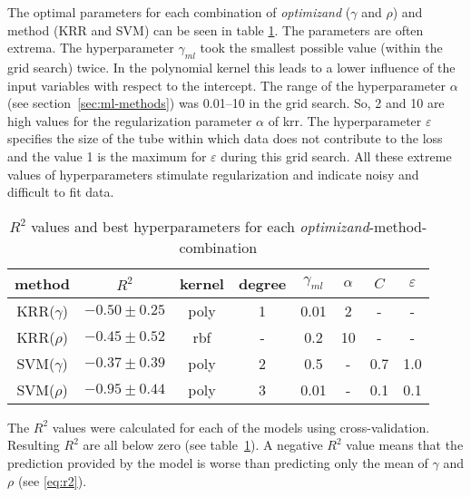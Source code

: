 The optimal parameters for each combination of 
\textit{optimizand} ($\gamma$ and $\rho$) and method (KRR and SVM) 
can be seen in table \ref{tab:grid-search}. 
The parameters are often extrema.
The hyperparameter $\gamma_{ml}$ took the smallest possible value (within the grid search) twice. 
In the polynomial kernel this leads to a lower influence of the input variables with respect to the intercept. 
The range of the hyperparameter $\alpha$ (see section~\ref{sec:ml-methods}) was 0.01--10 in the grid search. 
So, 2 and 10 are high values for the regularization parameter $\alpha$ of \gls{krr}.
The hyperparameter $\varepsilon$ specifies the size of the tube within which data does not contribute to the loss 
and the value 1 is the maximum for $\varepsilon$ during this grid search. 
All these extreme values of hyperparameters stimulate regularization and indicate noisy and difficult to fit data.
\begin{table}
    \center
    \begin{tabular}{cccccccc}
        \hline\hline
        method  &$R^2$   &kernel &degree &$\gamma_{ml}$   &$\alpha$    &$C$    &$\varepsilon$\\
        \hline
        KRR($\gamma$) & $-0.50 \pm 0.25$  &poly   &1  &0.01   &2 &-&-\\
        KRR($\rho  $) & $-0.45 \pm 0.52$  &rbf    &-   &0.2   &10&-&-\\
        SVM($\gamma$) & $-0.37 \pm 0.39$  &poly   &2  &0.5    &-&0.7  &1.0  \\
        SVM($\rho  $) & $-0.95 \pm 0.44$  &poly   &3  &0.01   &-&0.1  &0.1  \\
        \hline\hline
    \end{tabular}
    \caption{$R^2$ values and best hyperparameters for each \textit{optimizand}-method-combination}
    \label{tab:grid-search}
\end{table}
The $R^2$ values were calculated for each of the models using cross-validation. 
Resulting $R^2$ are all below zero (see table~\ref{tab:grid-search}). 
A negative $R^2$ value means that the prediction provided by the model is worse than predicting only the mean of $\gamma$ and $\rho$ (see \ref{eq:r2}). 

